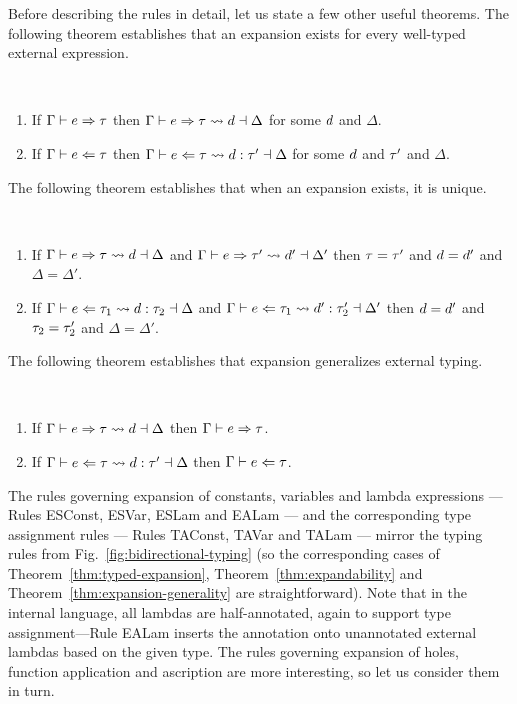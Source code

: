 Before describing the rules in detail, let us state a few other useful theorems. The following theorem establishes that an expansion exists for every well-typed external expression.
 \begin{thm}[Expandability] \label{thm:expandability}~
  \begin{enumerate}[nolistsep]
    \item
      If $\Gamma \vdash e \Rightarrow \tau$
      then $\Gamma \vdash e \Rightarrow \tau \leadsto d \dashv \Delta$
      for some $d$ and $\Delta$.
    \item
      If $\Gamma \vdash e \Leftarrow \tau$
      then $\Gamma \vdash e \Leftarrow \tau \leadsto d : \tau' \dashv \Delta$
      for some $d$ and $\tau'$ and $\Delta$.
  \end{enumerate}
\end{thm}
\noindent
The following theorem establishes that when an expansion exists, it is unique.
\begin{thm} \label{thm:expansion-unicity}~
  \begin{enumerate}[nolistsep]
    \item
      If $\Gamma \vdash e \Rightarrow \tau \leadsto d \dashv \Delta$
      and $\Gamma \vdash e \Rightarrow \tau' \leadsto d' \dashv \Delta'$
      then $\tau=\tau'$ and $d=d'$ and $\Delta=\Delta'$.
    \item
      If $\Gamma \vdash e \Leftarrow \tau_1 \leadsto d : \tau_2 \dashv \Delta$
      and $\Gamma \vdash e \Leftarrow \tau_1 \leadsto d' : \tau_2' \dashv \Delta'$
      then $d=d'$ and $\tau_2=\tau_2'$ and $\Delta=\Delta'$.
  \end{enumerate}
\end{thm}
\noindent
The following theorem establishes that expansion generalizes external typing.
\begin{thm} \label{thm:expansion-generality}~
  \begin{enumerate}[nolistsep]
    \item
      If $\Gamma \vdash e \Rightarrow \tau \leadsto d \dashv \Delta$
      then $\Gamma \vdash e \Rightarrow \tau$.
    \item
      If $\Gamma \vdash e \Leftarrow \tau \leadsto d : \tau' \dashv \Delta$
      then $\Gamma \vdash e \Leftarrow \tau$.
  \end{enumerate}
\end{thm}

The rules governing expansion of constants, variables and lambda expressions --- Rules {ESConst}, {ESVar}, {ESLam} and {EALam} --- and the corresponding type assignment rules --- Rules {TAConst}, {TAVar} and {TALam} --- mirror the typing rules from Fig.~\ref{fig:bidirectional-typing} (so the corresponding cases of Theorem~\ref{thm:typed-expansion}, Theorem~\ref{thm:expandability} and Theorem~\ref{thm:expansion-generality} are straightforward). Note that in the internal language, all lambdas are half-annotated, again to support type assignment---Rule {EALam} inserts the annotation onto unannotated external lambdas based on the given type. The rules governing expansion of holes, function application and ascription are more interesting, so let us consider them in turn.

